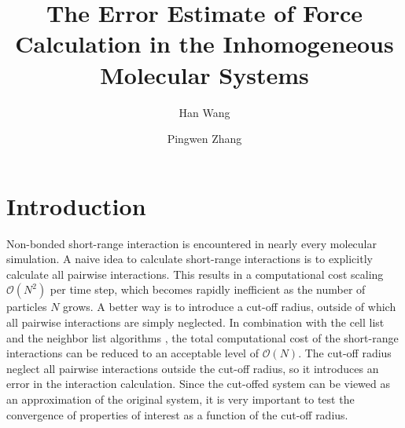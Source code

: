 \documentclass[aps,pre,preprint]{revtex4-1}
\begin{document}
\title{The Error Estimate of Force Calculation in the Inhomogeneous Molecular Systems}
\author{Han Wang}
\author{Pingwen Zhang}

\begin{abstract}
\end{abstract}

\maketitle

\section{Introduction}
Non-bonded short-range interaction is encountered in nearly every
molecular simulation.  A naive idea to calculate short-range
interactions is to explicitly calculate all pairwise
interactions. This results in a computational cost scaling $\mathcal
O(N^2)$ per time step, which becomes rapidly inefficient as the number
of particles $N$ grows. A better way is to introduce a cut-off
radius, outside of which all pairwise interactions are simply
neglected. In combination with the cell list and the neighbor list
algorithms \cite{frenkel02b}, the total computational cost of the
short-range interactions can be reduced to an acceptable level of
$\mathcal O(N)$.  The cut-off radius neglect all pairwise interactions
outside the cut-off radius, so it introduces an error in the interaction
calculation. Since the cut-offed system can be viewed as an approximation of
the original system, it is very important to test the
convergence of properties of interest as a function of the cut-off
radius.
\end{document}
